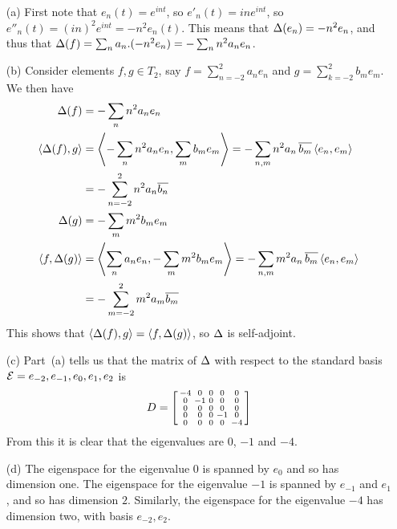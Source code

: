 \begin{itemize}
  \item[(a)]
   First note that $e_n(t)=e^{int}$, so $e'_n(t)=ine^{int}$, so
   $e''_n(t)=(in)^2e^{int}=-n^2e_n(t)$.  This means that
   $\Delta(e_n)=-n^2e_n$, and thus that
   $\Delta(f)=\sum_n a_n.(-n^2e_n)=-\sum_n n^2 a_n e_n$.
  \item[(b)]
   Consider elements $f,g\in T_2$, say $f=\sum_{n=-2}^2a_ne_n$ and
   $g=\sum_{k=-2}^2b_me_m$.  We then have
   \begin{align*}
    \Delta(f) &= -\sum_n n^2 a_n e_n \\
    \langle \Delta(f),g\rangle &=
     \left\langle -\sum_n n^2a_ne_n,\sum_m b_me_m\right\rangle
      = -\sum_{n,m} n^2 a_n\,\overline{b_m}\,\langle e_n,e_m\rangle \\
    &= -\sum_{n=-2}^2 n^2 a_n \overline{b_n} \\
    \Delta(g) &= -\sum_m m^2 b_m e_m \\
    \langle f,\Delta(g)\rangle &=
     \left\langle\sum_n a_ne_n,-\sum_m m^2b_me_m\right\rangle
      = -\sum_{n,m} m^2 a_n\,\overline{b_m}\,\langle e_n,e_m\rangle \\
    &= -\sum_{m=-2}^2 m^2 a_m \overline{b_m}
   \end{align*}
   This shows that $\langle \Delta(f),g\rangle=\langle f,\Delta(g)\rangle$, so $\Delta$ is
   self-adjoint.
  \item[(c)] Part~(a) tells us that the matrix of $\Delta$ with respect
   to the standard basis ${\mathcal{E}}=e_{-2},e_{-1},e_0,e_1,e_2$ is
   {\tiny \[
     D = \left[\begin{smallmatrix} -4 &  0 & 0 &  0 &  0 \\
               0 & -1 & 0 &  0 &  0 \\
               0 &  0 & 0 &  0 &  0 \\
               0 &  0 & 0 & -1 &  0 \\
               0 &  0 & 0 &  0 & -4 \end{smallmatrix}\right]
   \]}
   From this it is clear that the eigenvalues are $0$, $-1$ and $-4$.
  \item[(d)] The eigenspace for the eigenvalue $0$ is spanned by $e_0$
   and so has dimension one.  The eigenspace for the eigenvalue $-1$ is
   spanned by $e_{-1}$ and $e_1$, and so has dimension $2$.
   Similarly, the eigenspace for the eigenvalue $-4$ has dimension two,
   with basis $e_{-2},e_2$.
 \end{itemize}
\EndDeferredSolution

